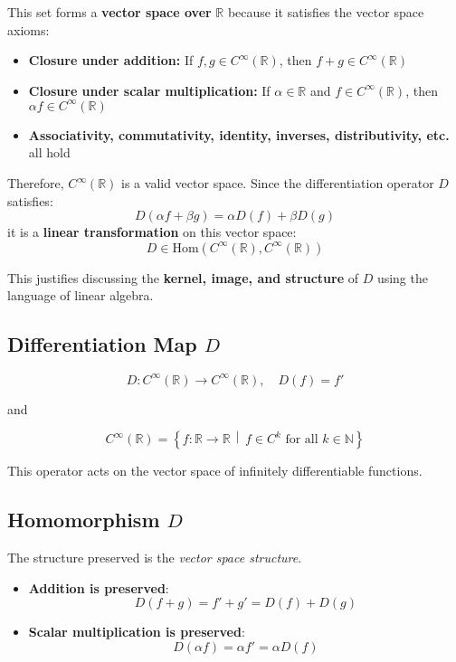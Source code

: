\documentclass[12pt]{article}
\begin{document}
	This set forms a \textbf{vector space over } \( \mathbb{R} \) because it satisfies the vector space axioms:
	
	\begin{itemize}
		\item \textbf{Closure under addition:} If \( f, g \in C^\infty(\mathbb{R}) \), then \( f + g \in C^\infty(\mathbb{R}) \)
		\item \textbf{Closure under scalar multiplication:} If \( \alpha \in \mathbb{R} \) and \( f \in C^\infty(\mathbb{R}) \), then \( \alpha f \in C^\infty(\mathbb{R}) \)
		\item \textbf{Associativity, commutativity, identity, inverses, distributivity, etc.} all hold
	\end{itemize}
	
	Therefore, \( C^\infty(\mathbb{R}) \) is a valid vector space. Since the differentiation operator \( D \) satisfies:
	$$
	D(\alpha f + \beta g) = \alpha D(f) + \beta D(g)
	$$
	it is a \textbf{linear transformation} on this vector space:
	$$
	D \in \mathrm{Hom}(C^\infty(\mathbb{R}), C^\infty(\mathbb{R}))
	$$
	
	This justifies discussing the \textbf{kernel, image, and structure} of \( D \) using the language of linear algebra.
	
	
	\subsection{Differentiation Map $D$} 
	
	$$
	D: C^\infty(\mathbb{R}) \to C^\infty(\mathbb{R}), \quad D(f) = f'
	$$
	
	and 
	
	$$
	C^\infty(\mathbb{R}) = \left\{ f : \mathbb{R} \to \mathbb{R} \,\middle|\, f \in C^k \text{ for all } k \in \mathbb{N} \right\}
	$$
	
	
	This operator acts on the vector space of infinitely differentiable functions.
	
	\subsection{Homomorphism $D$} 
	The structure preserved is the \emph{vector space structure}.
	
	\begin{itemize}
		\item \textbf{Addition is preserved}:
		$$
		D(f + g) = f' + g' = D(f) + D(g)
		$$
		
		\item \textbf{Scalar multiplication is preserved}:
		$$
		D(\alpha f) = \alpha f' = \alpha D(f)
		$$
	\end{itemize}
	
\end{document}
